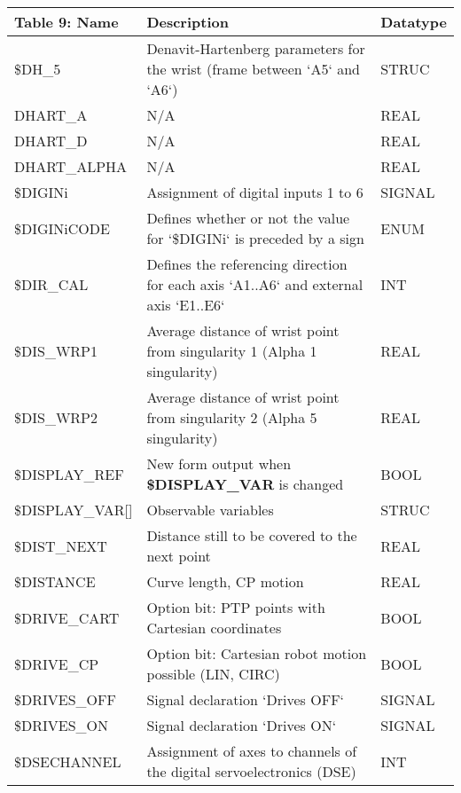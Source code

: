 \begin{appendices}
        \newpage
        \begin{tabular}{|p{}|p{}|p{}|}
        \hline
        \textbf{Table 9: Name} & \textbf{Description} & \textbf{Datatype} \\ \hline
        \$DH\_5 & Denavit-Hartenberg parameters for the wrist (frame between `A5` and `A6`) & STRUC \\ \hline
        \quad DHART\_A & N/A & REAL \\ \hline
        \quad DHART\_D & N/A & REAL \\ \hline
        \quad DHART\_ALPHA & N/A & REAL \\ \hline
        \$DIGINi & Assignment of digital inputs 1 to 6 & SIGNAL \\ \hline
        \$DIGINiCODE & Defines whether or not the value for `\$DIGINi` is preceded by a sign & ENUM \\ \hline
        \$DIR\_CAL & Defines the referencing direction for each axis `A1..A6` and external axis `E1..E6` & INT \\ \hline
        \$DIS\_WRP1 & Average distance of wrist point from singularity 1 (Alpha 1 singularity) & REAL \\ \hline
        \$DIS\_WRP2 & Average distance of wrist point from singularity 2 (Alpha 5 singularity) & REAL \\ \hline
        \$DISPLAY\_REF & New form output when \textbf{\$DISPLAY\_VAR} is changed & BOOL \\ \hline
        \$DISPLAY\_VAR[] & Observable variables & STRUC \\ \hline
        \$DIST\_NEXT & Distance still to be covered to the next point & REAL \\ \hline
        \$DISTANCE & Curve length, CP motion & REAL \\ \hline
        \$DRIVE\_CART & Option bit: PTP points with Cartesian coordinates & BOOL \\ \hline
        \$DRIVE\_CP & Option bit: Cartesian robot motion possible (LIN, CIRC) & BOOL \\ \hline
        \$DRIVES\_OFF & Signal declaration `Drives OFF` & SIGNAL \\ \hline
        \$DRIVES\_ON & Signal declaration `Drives ON` & SIGNAL \\ \hline
        \$DSECHANNEL & Assignment of axes to channels of the digital servoelectronics (DSE) & INT \\ \hline
        \end{tabular}
        

\end{appendices}

